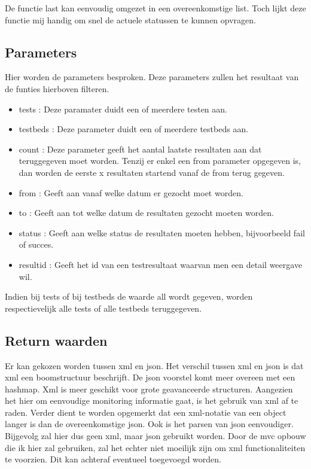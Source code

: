 \documentclass[11pt]{article}
\begin{document}
De functie last kan eenvoudig omgezet in een overeenkomstige list. Toch lijkt deze functie mij handig om snel de actuele statussen te kunnen opvragen.

\subsection{Parameters}
Hier worden de parameters besproken. Deze parameters zullen het resultaat van de funties hierboven filteren.

\begin{itemize}
\item tests : Deze paramater duidt een of meerdere testen aan.
\item testbeds : Deze parameter duidt een of meerdere testbeds aan.
\item count : Deze parameter geeft het aantal laatste resultaten aan dat teruggegeven moet worden. Tenzij er enkel een from parameter opgegeven is, dan worden de eerste x resultaten startend vanaf de from terug gegeven.
\item from : Geeft aan vanaf welke datum er gezocht moet worden.
\item to : Geeft aan tot welke datum de resultaten gezocht moeten worden.
\item status : Geeft aan welke status de resultaten moeten hebben, bijvoorbeeld fail of succes.
\item resultid : Geeft het id van een testresultaat waarvan men een detail weergave wil.
\end{itemize}
Indien bij tests of bij testbeds de waarde all wordt gegeven, worden respectievelijk alle tests of alle testbeds teruggegeven.

\clearpage
\subsection{Return waarden}
Er kan gekozen worden tussen xml en json. Het verschil tussen xml en json is dat xml een boomstructuur beschrijft. De json voorstel komt meer overeen met een hashmap. Xml is meer geschikt voor grote geavanceerde structuren. Aangezien het hier om eenvoudige monitoring informatie gaat, is het gebruik van xml af te raden. Verder dient te worden opgemerkt dat een xml-notatie van een object langer is dan de overeenkomstige json. Ook is het parsen van json eenvoudiger. Bijgevolg zal hier dus geen xml, maar json gebruikt worden. Door de mvc opbouw die ik hier zal gebruiken, zal het echter niet moeilijk zijn om xml functionaliteiten te voorzien. Dit kan achteraf eventueel toegevoegd worden.\\
\end{document}
